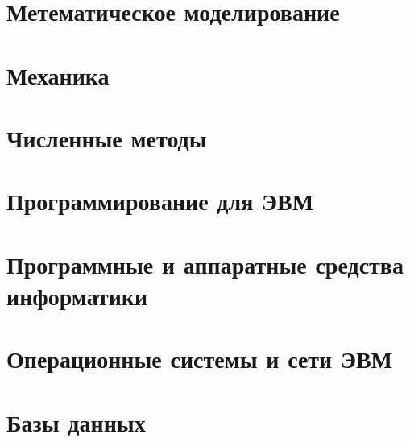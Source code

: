 \documentclass[12pt]{report}
\theoremstyle{plain}
\begin{document}
\chapter{Метематическое моделирование}

\chapter{Механика}

\chapter{Численные методы}

\chapter{Программирование для ЭВМ}

\chapter{Программные и аппаратные средства информатики}

\chapter{Операционные системы и сети ЭВМ}

\chapter{Базы данных}
\end{document}
